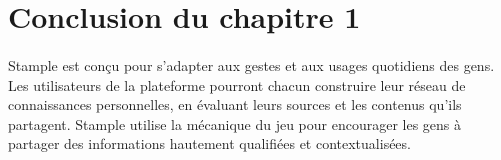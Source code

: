 \section{Conclusion du chapitre 1}

\paragraph{}
Stample est conçu pour s'adapter aux gestes et aux usages quotidiens des gens. Les utilisateurs de la plateforme pourront chacun construire leur réseau de connaissances personnelles, en évaluant leurs sources et les contenus qu'ils partagent.
Stample utilise la mécanique du jeu pour encourager les gens à partager des informations hautement qualifiées et contextualisées.
